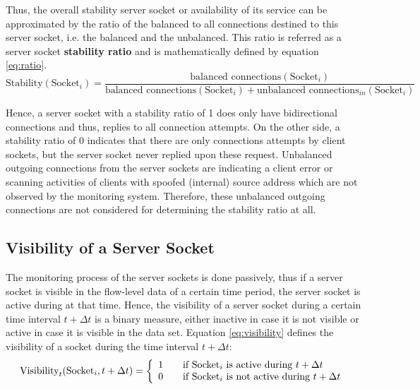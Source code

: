 Thus, the overall stability \gls{server socket} or availability of its service
can be approximated by the ratio of the balanced to all connections destined to
this \gls{server socket}, i.e. the balanced and the unbalanced. This ratio is
referred as a \gls{server socket} \textbf{stability ratio} and is mathematically
defined by equation \ref{eq:ratio}.
\begin{equation}
	\text{Stability}(\text{Socket}_i) = \frac{\text{balanced connections}(\text{Socket}_i)}{\text{balanced connections}(\text{Socket}_i) + \text{unbalanced connections}_{in}(\text{Socket}_i)}
	\label{eq:ratio}
\end{equation}

Hence, a \gls{server socket} with a stability ratio of 1 does only have
bidirectional connections and thus, replies to all connection attempts. On the
other side, a stability ratio of 0 indicates that there are only connections
attempts by client sockets, but the \gls{server socket} never replied upon these
request. Unbalanced outgoing connections from the \glspl{server socket} are
indicating a client error or scanning activities of clients with spoofed
(internal) source address which are not observed by the monitoring system.
Therefore, these unbalanced outgoing connections are not considered for
determining the stability ratio at all.

\subsection{Visibility of a Server Socket\label{subsection:visibility}}

The monitoring process of the \glspl{server socket} is done passively, thus if a
\gls{server socket} is visible in the flow-level data of a certain time period,
the \gls{server socket} is active during at that time. Hence, the visibility of
a \gls{server socket} during a certain time interval $t+\Delta{t}$ is a binary
measure, either inactive in case it is not visible or active in case it is
visible in the data set. Equation \ref{eq:visibility} defines the visibility of
a socket during the time interval $t+\Delta{t}$:
\begin{equation}
	\text{Visibility}_t(\text{Socket}_i,t+\Delta{t}) = \left\{
	\begin{array}{l l}
		1 & \quad \text{if $\text{Socket}_i$ is active during $t+\Delta{t}$}\\
		0 & \quad \text{if $\text{Socket}_i$ is not active during $t+\Delta{t}$}\\
	\end{array}
	\right.
	\label{eq:visibility}
\end{equation}

